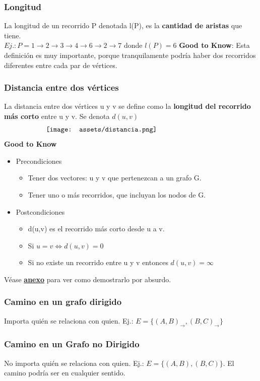 \documentclass[10pt,a4paper]{article}
\begin{document}
\subsubsection*{Longitud}
La longitud de un recorrido P denotada l(P), es la \textbf{cantidad de aristas} que tiene. \\
$Ej.: P = 1 \rightarrow 2 \rightarrow 3 \rightarrow 4 \rightarrow 6 \rightarrow 2 \rightarrow 7$ donde $l(P) = 6$
\textbf{Good to Know}: Esta definición es muy importante, porque tranquilamente podría haber dos recorridos diferentes entre cada par de vértices.
\subsubsection*{Distancia entre dos vértices}
La distancia entre dos vértices u y v se define como la \textbf{longitud del recorrido más corto} entre u y v. Se denota $d(u,v)$ 
\[\begin{minipage}[b]{0.7\textwidth}
    \texttt{[image: assets/distancia.png]}
\end{minipage}\]
\textbf{Good to Know} 
\begin{itemize}
    \item Precondiciones
    \begin{itemize}
        \item Tener dos vectores: u y v que pertenezcan a un grafo G.
        \item Tener uno o más recorridos, que incluyan los nodos de G.
    \end{itemize}
    \item Postcondiciones
    \begin{itemize}
        \item d(u,v) es el recorrido más corto desde u a v.
        \item Si $u=v \iff d(u,v) = 0$
        \item Si no existe un recorrido entre u y v entonces $d(u,v) = \infty$
    \end{itemize}
\end{itemize}
Véase \hyperref[subsubsec:distancia_demostracion]{\textbf{anexo}} para ver como demostrarlo por absurdo.
\subsubsection*{Camino en un grafo dirigido}
Importa quién se relaciona con quien. Ej.: $E = \{(A, B)_{\rightarrow}, (B, C)_{\rightarrow}\}$
\subsubsection*{Camino en un Grafo no Dirigido}
No importa quién se relaciona con quien. Ej.: $E = \{(A, B), (B, C)\}$. El camino podría ser en cualquier sentido. 
\end{document}
